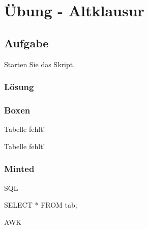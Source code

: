\section{Übung - Altklausur}
\label{sec:uebung_01}

\subsection{Aufgabe}
\label{subsec:uebung_01.aufgabe_01}
Starten Sie das Skript.

\subsubsection*{Lösung}
\label{subsubsec:uebung_01.aufgabe_01.loesung}


\subsubsection*{Boxen}
\begin{warn-popup}
  Tabelle fehlt!
\end{warn-popup}

\begin{info-popup}
  Tabelle fehlt!
\end{info-popup}

\subsubsection*{Minted}
SQL
\begin{sqlcode}
  SELECT *
  FROM tab;
\end{sqlcode}

AWK
